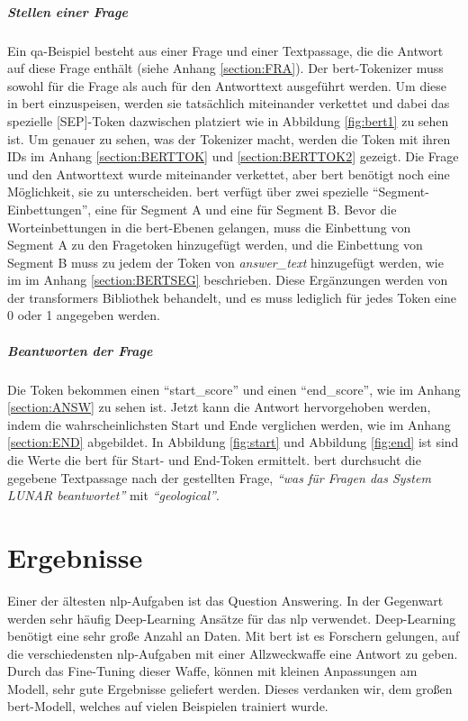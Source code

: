 \documentclass[
        ngerman,
        paper=a4,
        numbers=noendperiod,
]{scrreprt}
\begin{document}
\paragraph{Stellen einer Frage}
Ein \ac{qa}-Beispiel besteht aus einer Frage und einer Textpassage, die die Antwort auf diese Frage enthält (siehe Anhang \ref{section:FRA}). Der \ac{bert}-Tokenizer muss sowohl für die Frage als auch für den Antworttext ausgeführt werden. Um diese in \ac{bert} einzuspeisen, werden sie tatsächlich miteinander verkettet und dabei das spezielle [SEP]-Token dazwischen platziert wie in Abbildung \ref{fig:bert1} zu sehen ist. Um genauer zu sehen, was der Tokenizer macht, werden die Token mit ihren IDs im Anhang \ref{section:BERTTOK} und \ref{section:BERTTOK2} gezeigt. Die Frage und den Antworttext wurde miteinander verkettet, aber \ac{bert} benötigt noch eine Möglichkeit, sie zu unterscheiden. \ac{bert} verfügt über zwei spezielle \enquote{Segment-Einbettungen}, eine für Segment A und eine für Segment B. Bevor die Worteinbettungen in die \ac{bert}-Ebenen gelangen, muss die Einbettung von Segment A zu den Fragetoken hinzugefügt werden, und die Einbettung von Segment B muss zu jedem der Token von \textit{answer\_text} hinzugefügt werden, wie im im Anhang \ref{section:BERTSEG} beschrieben. Diese Ergänzungen werden von der transformers Bibliothek behandelt, und es muss lediglich für jedes Token eine 0 oder 1 angegeben werden.

\paragraph{Beantworten der Frage}
Die Token bekommen einen \enquote{start\_score} und einen \enquote{end\_score}, wie im Anhang \ref{section:ANSW} zu sehen ist. Jetzt kann die Antwort hervorgehoben werden, indem die wahrscheinlichsten Start und Ende verglichen werden, wie im Anhang \ref{section:END} abgebildet. In Abbildung \ref{fig:start} und Abbildung \ref{fig:end} ist sind die Werte die \ac{bert} für Start- und End-Token ermittelt. \ac{bert} durchsucht die gegebene Textpassage nach der gestellten Frage, \textit{\enquote{was für Fragen das System LUNAR beantwortet}} mit \textit{\enquote{geological}}. 



\chapter{Ergebnisse}

Einer der ältesten \ac{nlp}-Aufgaben ist das Question Answering. In der Gegenwart werden sehr häufig Deep-Learning Ansätze für das \ac{nlp} verwendet. Deep-Learning benötigt eine sehr große Anzahl an Daten. Mit \ac{bert} ist es Forschern gelungen, auf die verschiedensten \ac{nlp}-Aufgaben mit einer Allzweckwaffe eine Antwort zu geben. Durch das Fine-Tuning dieser Waffe, können mit kleinen Anpassungen am Modell, sehr gute Ergebnisse geliefert werden. Dieses verdanken wir, dem großen \ac{bert}-Modell, welches auf vielen Beispielen trainiert wurde.
\end{document}
